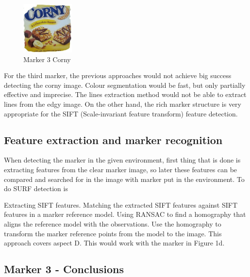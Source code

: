 \begin{figure}[ht!]
	\centering
	\includegraphics[width=100px]{figures/Marker3}
	\caption{Marker 3 Corny}
	\label{fig:markerColor}
\end{figure}

For the third marker, the previous approaches would not achieve big success detecting the corny image. Colour segmentation would be fast, but only partially effective and imprecise. The lines extraction method would not be able to extract lines from the edgy image. On the other hand, the rich marker structure is very appropriate for the SIFT (Scale-invariant feature transform) feature detection. 

\subsection{Feature extraction and marker recognition}

When detecting the marker in the given environment, first thing that is done is extracting features from the clear marker image, so later these features can be compared and searched for in the image with marker put in the environment. To do SURF detection is 

Extracting SIFT features. Matching the extracted SIFT features against
SIFT features in a marker reference model. Using RANSAC to find
a homography that aligns the reference model with the observations.
Use the homography to transform the marker reference points from
the model to the image. This approach covers aspect D. This would
work with the marker in Figure 1d.
\subsection{Marker 3 - Conclusions}
